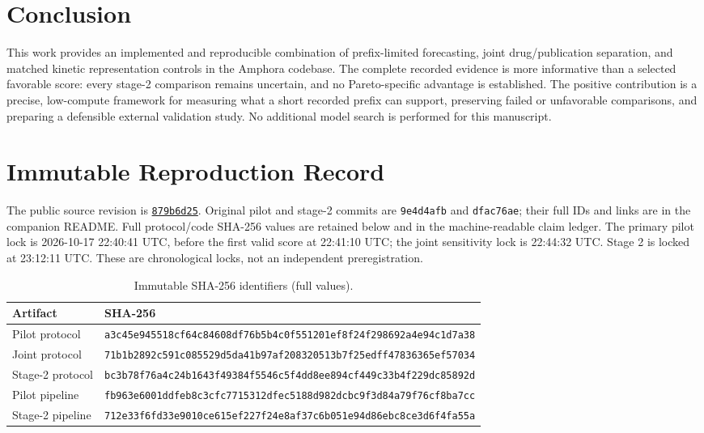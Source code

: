 \documentclass[conference,letterpaper]{IEEEtran}
\newcommand{\code}[1]{\texttt{#1}}
\begin{document}
\section{Conclusion}
This work provides an implemented and reproducible combination of prefix-limited forecasting, joint drug/publication separation, and matched kinetic representation controls in the Amphora codebase. The complete recorded evidence is more informative than a selected favorable score: every stage-2 comparison remains uncertain, and no Pareto-specific advantage is established. The positive contribution is a precise, low-compute framework for measuring what a short recorded prefix can support, preserving failed or unfavorable comparisons, and preparing a defensible external validation study. No additional model search is performed for this manuscript.

\appendices
\section{Immutable Reproduction Record}
The public source revision is \href{https://github.com/neverhuman/mvp20-split/tree/879b6d254e10848020635cc2ae2c654968a0cfc1}{\code{879b6d25}}. Original pilot and stage-2 commits are \code{9e4d4afb} and \code{dfac76ae}; their full IDs and links are in the companion README. Full protocol/code SHA-256 values are retained below and in the machine-readable claim ledger. The primary pilot lock is 2026-10-17 22:40:41 UTC, before the first valid score at 22:41:10 UTC; the joint sensitivity lock is 22:44:32 UTC. Stage 2 is locked at 23:12:11 UTC. These are chronological locks, not an independent preregistration.

\begin{table}[h]
\caption{Immutable SHA-256 identifiers (full values).}
\centering\scriptsize
\begin{tabularx}{\columnwidth}{@{}p{}X@{}}\toprule
Artifact & SHA-256 \\\midrule
Pilot protocol & \nolinkurl{a3c45e945518cf64c84608df76b5b4c0f551201ef8f24f298692a4e94c1d7a38} \\
Joint protocol & \nolinkurl{71b1b2892c591c085529d5da41b97af208320513b7f25edff47836365ef57034} \\
Stage-2 protocol & \nolinkurl{bc3b78f76a4c24b1643f49384f5546c5f4dd8ee894cf449c33b4f229dc85892d} \\
Pilot pipeline & \nolinkurl{fb963e6001ddfeb8c3cfc7715312dfec5188d982dcbc9f3d84a79f76cf8ba7cc} \\
Stage-2 pipeline & \nolinkurl{712e33f6fd33e9010ce615ef227f24e8af37c6b051e94d86ebc8ce3d6f4fa55a} \\\bottomrule
\end{tabularx}
\end{table}
\end{document}
